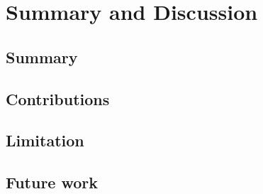 \chapter{Summary and Discussion}
\label{ch:summaryanddiscussion}


\section{Summary}

\section{Contributions}

\section{Limitation}

\section{Future work}